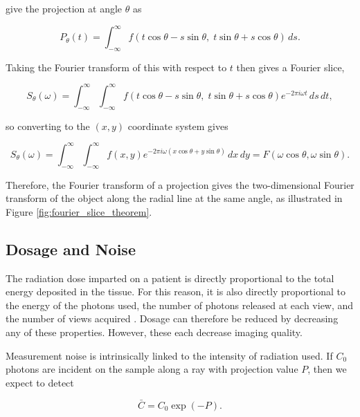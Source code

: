 give the projection at angle $\theta$ as

\begin{equation}
P_\theta(t)=
\int_{-\infty}^{\infty}
f(t\cos\theta-s\sin\theta,\;t\sin\theta+s\cos\theta)\,ds.
\label{eq:projection_rotated_coordinates}
\end{equation}

Taking the Fourier transform of this with respect to $t$ then gives a Fourier slice,

\begin{equation}
S_\theta(\omega)
=
\int_{-\infty}^{\infty}\int_{-\infty}^{\infty}
f(t\cos\theta-s\sin\theta,\;t\sin\theta+s\cos\theta)
e^{-2\pi i \omega t}
\,ds\,dt,
\label{eq:projection_fourier_transform}
\end{equation}

so converting to the $(x,y)$ coordinate system gives

\begin{equation}
S_\theta(\omega)
=
\int_{-\infty}^{\infty}\int_{-\infty}^{\infty}
f(x,y)e^{-2\pi i\omega(x\cos\theta+y\sin\theta)}
\,dx\,dy = F(\omega \cos \theta, \omega \sin \theta).
\label{eq:fourier_slice_theorem}
\end{equation}

Therefore, the Fourier transform of a projection gives the two-dimensional Fourier transform of the object along the radial line at the same angle, as illustrated in Figure \ref{fig:fourier_slice_theorem}.

\subsection{Dosage and Noise}
\label{subsec:dosage_noise}

The radiation dose imparted on a patient is directly proportional to the total energy deposited in the tissue. For this reason, it is also directly proportional to the energy of the photons used, the number of photons released at each view, and the number of views acquired \cite{}. Dosage can therefore be reduced by decreasing any of these properties. However, these each decrease imaging quality.

Measurement noise is intrinsically linked to the intensity of radiation used. If $C_0$ photons are incident on the sample along a ray with projection value $P$, then we expect to detect

\begin{equation}
\bar C = C_0 \exp(-P).
\label{eq:expected_photon_count}
\end{equation}

